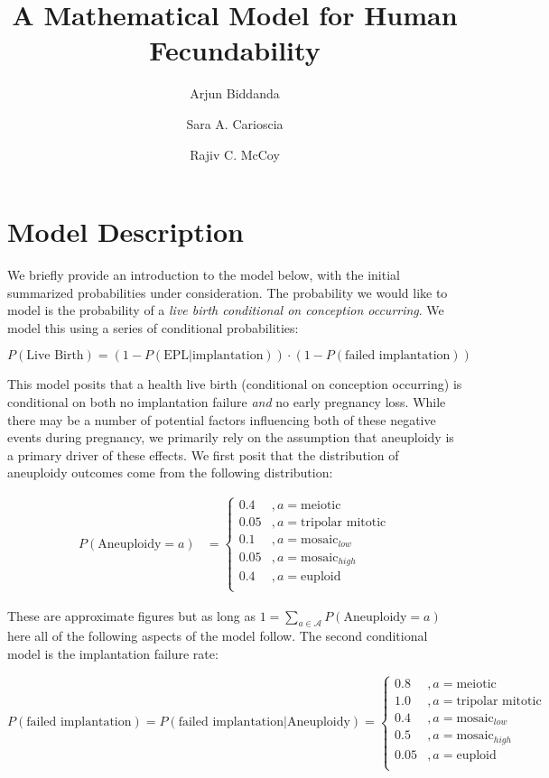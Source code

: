 \documentclass{article}
\title{A Mathematical Model for Human Fecundability}
\author[1]{Arjun Biddanda}
\author[1]{Sara A. Carioscia}
\author[1]{Rajiv C. McCoy}
\affil[1]{Department of Biology, Johns Hopkins University}
\begin{document}
\maketitle

\section*{Model Description}

We briefly provide an introduction to the model below, with the initial summarized probabilities under consideration. The  probability we would like to model is the probability of a \textit{live birth conditional on conception occurring}. We model this using a series of conditional probabilities: 

\begin{equation}
	P(\text{Live Birth}) =  (1 - P(\text{EPL} | \text{implantation})) \cdot (1 - P(\text{failed implantation}))
\end{equation}

This model posits that a health live birth (conditional on conception occurring) is conditional on both no implantation failure \textit{and} no early pregnancy loss. While there may be a number of potential factors influencing both of these negative events during pregnancy, we primarily rely on the assumption that aneuploidy is a primary driver of these effects. We first posit that the distribution of aneuploidy outcomes come from the following distribution: 

\begin{equation}
\begin{aligned}
P(\text{Aneuploidy} = a) &= \begin{cases}
0.4 &, a = \text{meiotic}\\
0.05 &, a = \text{tripolar mitotic}\\
0.1 &, a = \text{mosaic}_{low}\\
0.05 &, a = \text{mosaic}_{high}\\
0.4 &, a = \text{euploid}\\
\end{cases}
\end{aligned}
\end{equation}

These are approximate figures but as long as $1 = \sum_{a \in \mathcal{A}} P(\text{Aneuploidy} = a)$ here all of the following aspects of the model follow. The second conditional model is the implantation failure rate: 

\begin{equation}
P(\text{failed implantation}) = P(\text{failed implantation} | \text{Aneuploidy}) = \begin{cases}
0.8 &, a = \text{meiotic}\\
1.0 &, a = \text{tripolar mitotic}\\
0.4 &, a = \text{mosaic}_{low}\\
0.5 &, a = \text{mosaic}_{high}\\
0.05 &, a = \text{euploid}\\
\end{cases}
\end{equation}
\end{document}
